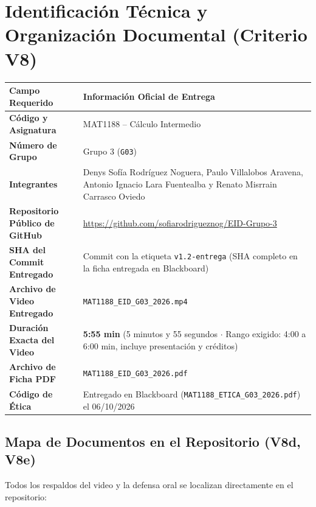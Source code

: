 \documentclass[10pt, a4paper]{article}
\newcommand{\CommitSHA}{Commit con la etiqueta \texttt{v1.2-entrega} (SHA completo en la ficha entregada en Blackboard)}
\newcommand{\DuracionVideo}{\textbf{5:55 min} (5 minutos y 55 segundos $\cdot$ Rango exigido: 4:00 a 6:00 min, incluye presentación y créditos)}
\begin{document}
\section{Identificación Técnica y Organización Documental (Criterio V8)}

\begin{tabularx}{\textwidth}{@{} >{\bfseries}p{5.0cm} Y @{}}
\toprule
Campo Requerido & Información Oficial de Entrega \\
\midrule
Código y Asignatura & MAT1188 -- Cálculo Intermedio \\
Número de Grupo & Grupo 3 (\texttt{G03}) \\
Integrantes & Denys Sofía Rodríguez Noguera, Paulo Villalobos Aravena, Antonio Ignacio Lara Fuentealba y Renato Misrrain Carrasco Oviedo \\
Repositorio Público de GitHub & \url{https://github.com/sofiarodrigueznog/EID-Grupo-3} \\
SHA del Commit Entregado & \CommitSHA \\
Archivo de Video Entregado & \texttt{MAT1188\_EID\_G03\_2026.mp4} \\
Duración Exacta del Video & \DuracionVideo \\
Archivo de Ficha PDF & \texttt{MAT1188\_EID\_G03\_2026.pdf} \\
Código de Ética & Entregado en Blackboard (\texttt{MAT1188\_ETICA\_G03\_2026.pdf}) el 06/10/2026 \\
\bottomrule
\end{tabularx}

\subsection*{Mapa de Documentos en el Repositorio (V8d, V8e)}
Todos los respaldos del video y la defensa oral se localizan directamente en el repositorio:
\end{document}
